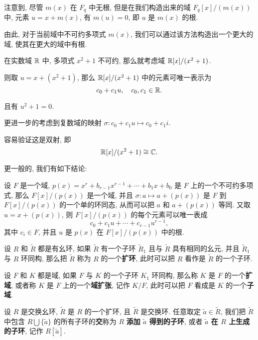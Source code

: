 注意到, 尽管 $m(x)$ 在 $F_q$ 中无根, 但是在我们构造出来的域 $F_q[x]/(m(x))$ 中, 元素 $u=x+m(x)$, 有 $m(u)=0$, 即 $u$ 是 $m(x)$ 的根.

由此, 对于当前域中不可约多项式 $m(x)$, 我们可以通过该方法构造出一个更大的域, 使其在更大的域中有根.

\begin{example}
	在实数域 $\mathbb R$ 中, 多项式 $x^2+1$ 不可约, 那么就考虑域 $\mathbb R[x]/(x^2+1)$.

	则取 $u=x+(x^2+1)$, 那么 $\mathbb R[x]/(x^2+1)$ 中的元素可唯一表示为 $$c_0+c_1u,\quad c_0,c_1\in \mathbb R.$$

	且有 $u^2+1=0$.

	更进一步的考虑到复数域的映射 $\sigma:c_0+c_1u\mapsto c_0+c_1i$.

	容易验证这是双射, 即 $$\mathbb R[x]/(x^2+1)\cong \mathbb C.$$
\end{example}

更一般的, 我们有如下结论:

\begin{theorem}
	设 $F$ 是一个域, $p(x)=x^r+b_{r-1}x^{r-1}+\cdots+b_1x+b_0$ 是 $F$ 上的一个不可约多项式, 那么 $F[x]/(p(x))$ 是一个域, 并且 $\sigma:a\mapsto a+(p(x))$ 是 $F$ 到 $F[x]/(p(x))$ 的一个单的环同态, 从而可以把 $a$ 和 $a+(p(x))$ 等同. 又取 $u=x+(p(x))$, 则 $F[x]/(p(x))$ 的每个元素可以唯一表成 $$c_0+c_1u+\cdots+c_{r-1}u^{r-1},$$ 其中 $c_i\in F$, 并且 $u$ 是 $p(x)$ 在 $F[x]/(p(x))$ 中的根.
\end{theorem}

\begin{definition}\label{扩环}
	设 $R$ 和 $\widetilde{R}$ 都是有幺环, 如果 $\widetilde{R}$ 有一个子环 $\widetilde{R}_1$ 且与 $\widetilde{R}$ 具有相同的幺元, 并且 $\widetilde{R}_1$ 与 $R$ 环同构, 那么把 $\widetilde{R}$ 称为 $R$ 的一个\textbf{扩环}, 此时可以把 $R$ 看作是 $\widetilde{R}$ 的一个子环.
\end{definition}

\begin{definition}\label{域扩张}
	设 $F$ 和 $K$ 都是域, 如果 $F$ 与 $K$ 的一个子环 $K_1$ 环同构, 那么称 $K$ 是 $F$ 的一个\textbf{扩域}, 或者称 $K$ 是 $F$ 上的一个\textbf{域扩张}, 记作 $K/F$, 此时可以把 $F$ 看成是 $K$ 的一个\textbf{子域}.
\end{definition}

\begin{definition}\label{元素生成的子环}
	设 $R$ 是交换幺环, $\widetilde{R}$ 是 $R$ 的一个扩环, 且 $\widetilde{R}$ 是交换环. 任意取定 $\widetilde{a}\in\widetilde{R}$, 我们把 $\widetilde{R}$ 中包含 $R\bigcup \{\widetilde{a}\}$ 的所有子环的\textbf{交}称为 $R$ \textbf{添加 $\widetilde{a}$ 得到的子环}, 或者 \textbf{$\widetilde{a}$ 在 $R$ 上生成的子环}, 记作 $R[\widetilde{a}]$.
\end{definition}

